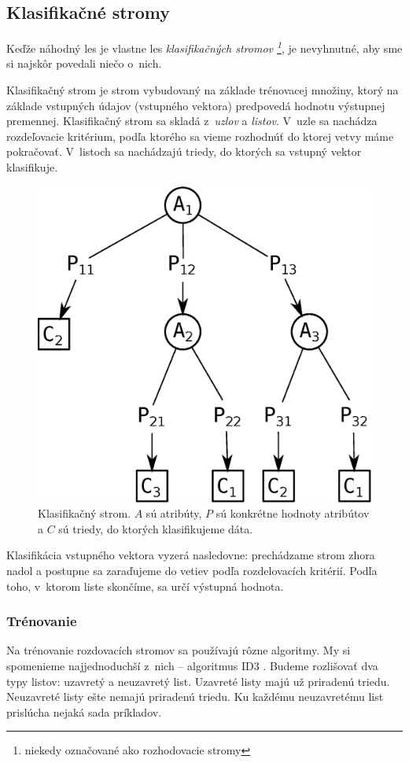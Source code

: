 \subsection{Klasifikačné stromy}
Keďže náhodný les je vlastne les \textit{klasifikačných stromov \footnote{niekedy označované ako rozhodovacie stromy}}, je nevyhnutné, aby sme si najskôr povedali niečo o~nich.

Klasifikačný strom je strom vybudovaný na základe trénovacej množiny, ktorý na základe vstupných údajov (vstupného vektora) predpovedá hodnotu výstupnej premennej. Klasifikačný strom sa skladá z~\textit{uzlov} a \textit{listov}. V~uzle sa nachádza rozdeľovacie kritérium, podľa ktorého sa vieme rozhodnúť do ktorej vetvy máme pokračovať. V~listoch sa nachádzajú triedy, do ktorých sa vstupný vektor klasifikuje.


\begin{figure}[htp]
    \centering
    \includegraphics[width=.5\textwidth]{images/decision_tree}
    \caption[Klasifikačný strom]{Klasifikačný strom. $A$ sú atribúty, $P$ sú konkrétne hodnoty atribútov a $C$ sú triedy, do ktorých klasifikujeme dáta.}
\end{figure}

Klasifikácia vstupného vektora vyzerá nasledovne: prechádzame strom zhora nadol a postupne sa zaraďujeme do vetiev podľa rozdelovacích kritérií. Podľa toho, v~ktorom liste skončíme, sa určí výstupná hodnota.

\subsubsection{Trénovanie}

Na trénovanie rozdovacích stromov sa používajú rôzne algoritmy. My si spomenieme najjednoduchší z~nich -- algoritmus ID3 \cite{wiki:id3}. Budeme rozlišovať dva typy listov: uzavretý a neuzavretý list. Uzavreté listy majú už priradenú triedu. Neuzavreté listy ešte nemajú priradenú triedu. Ku každému neuzavretému list prislúcha nejaká sada príkladov.

